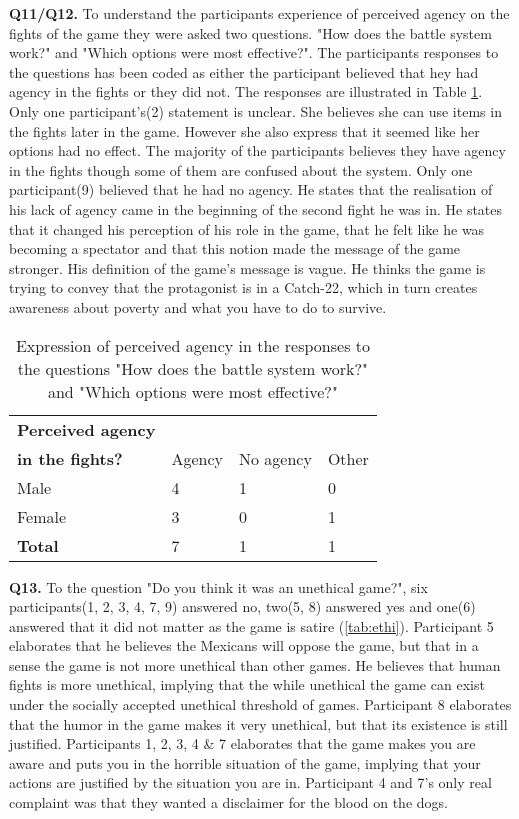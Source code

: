 \textbf{Q11/Q12.} To understand the participants experience of perceived agency on the fights of the game they were asked two questions. "How does the battle system work?" and "Which options were most effective?". The participants responses to the questions has been coded as either the participant believed that hey had agency in the fights or they did not. The responses are illustrated in Table \ref{tab:agen}. Only one participant's(2) statement is unclear. She believes she can use items in the fights later in the game. However she also express that it seemed like her options had no effect. The majority of the participants believes they have agency in the fights though some of them are confused about the system. Only one participant(9) believed that he had no agency. He states that the realisation of his lack of agency came in the beginning of the second fight he was in. He states that it changed his perception of his role in the game, that he felt like he was becoming a spectator and that this notion made the message of the game stronger. His definition of the game's message is vague. He thinks the game is trying to convey that the protagonist is in a Catch-22, which in turn creates awareness about poverty and what you have to do to survive.

\begin{table}[h]
\centering
\begin{tabular}{l l l l}
\hline
\textbf{Perceived agency}\\
\textbf{in the fights?} & Agency & No agency & Other \\
\hline
Male & 4 & 1 & 0 \\
Female & 3 & 0 & 1 \\
\textbf{Total} & 7 & 1 & 1 \\
\hline
\end{tabular}
\caption{\label{tab:agen}Expression of perceived agency in the responses to the questions "How does the battle system work?" and "Which options were most effective?"}
\end{table}


\textbf{Q13.} To the question "Do you think it was an unethical game?", six participants(1, 2, 3, 4, 7, 9) answered no, two(5, 8) answered yes and one(6) answered that it did not matter as the game is satire (\ref{tab:ethi}). Participant 5 elaborates that he believes the Mexicans will oppose the game, but that in a sense the game is not more unethical than other games. He believes that human fights is more unethical, implying that the while unethical the game can exist under the socially accepted unethical threshold of games. Participant 8 elaborates that the humor in the game makes it very unethical, but that its existence is still justified. Participants 1, 2, 3, 4 & 7 elaborates that the game makes you are aware and puts you in the horrible situation of the game, implying that your actions are justified by the situation you are in. Participant 4 and 7's only real complaint was that they wanted a disclaimer for the blood on the dogs.


